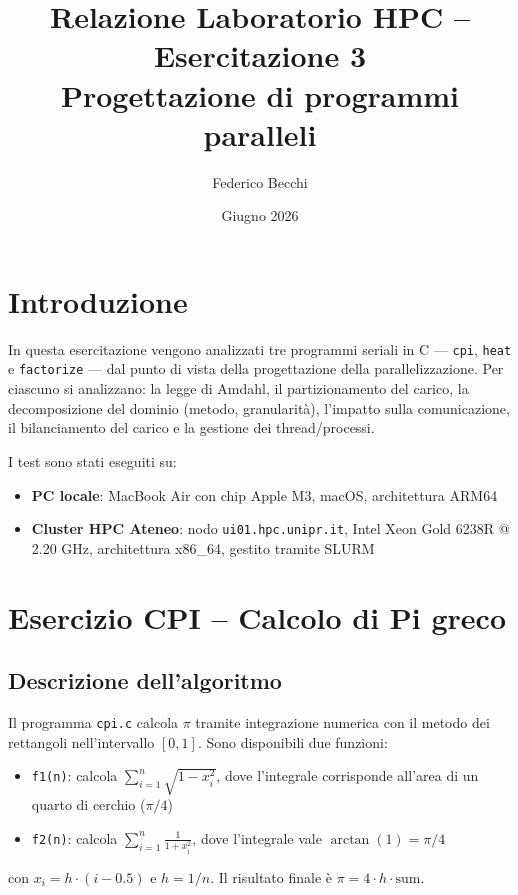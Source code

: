 \documentclass[a4paper,12pt]{article}
\title{Relazione Laboratorio HPC -- Esercitazione 3\\
\large Progettazione di programmi paralleli}
\author{Federico Becchi}
\date{Giugno 2026}
\begin{document}
\maketitle

\section{Introduzione}

In questa esercitazione vengono analizzati tre programmi seriali in C --- \texttt{cpi}, \texttt{heat} e \texttt{factorize} --- dal punto di vista della progettazione della parallelizzazione. Per ciascuno si analizzano: la legge di Amdahl, il partizionamento del carico, la decomposizione del dominio (metodo, granularit\`a), l'impatto sulla comunicazione, il bilanciamento del carico e la gestione dei thread/processi.

I test sono stati eseguiti su:
\begin{itemize}
    \item \textbf{PC locale}: MacBook Air con chip Apple M3, macOS, architettura ARM64
    \item \textbf{Cluster HPC Ateneo}: nodo \texttt{ui01.hpc.unipr.it}, Intel Xeon Gold 6238R @ 2.20 GHz, architettura x86\_64, gestito tramite SLURM
\end{itemize}

\section{Esercizio CPI -- Calcolo di Pi greco}

\subsection{Descrizione dell'algoritmo}

Il programma \texttt{cpi.c} calcola $\pi$ tramite integrazione numerica con il metodo dei rettangoli nell'intervallo $[0,1]$. Sono disponibili due funzioni:
\begin{itemize}
    \item \texttt{f1(n)}: calcola $\displaystyle\sum_{i=1}^{n} \sqrt{1-x_i^2}$, dove l'integrale corrisponde all'area di un quarto di cerchio ($\pi/4$)
    \item \texttt{f2(n)}: calcola $\displaystyle\sum_{i=1}^{n} \frac{1}{1+x_i^2}$, dove l'integrale vale $\arctan(1) = \pi/4$
\end{itemize}
con $x_i = h \cdot (i - 0.5)$ e $h = 1/n$. Il risultato finale \`e $\pi = 4 \cdot h \cdot \text{sum}$.
\end{document}
